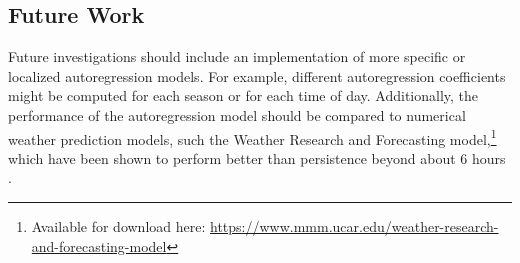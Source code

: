 \documentclass[11pt, oneside]{article}
\begin{document}
\subsection{Future Work} %
Future investigations should include an implementation of more specific or localized autoregression models.
For example, different autoregression coefficients might be computed for each season or for each time of day.
Additionally, the performance of the autoregression model should be compared to numerical weather prediction models, such the Weather Research and Forecasting model,\footnote{Available for download here: \url{https://www.mmm.ucar.edu/weather-research-and-forecasting-model}} which have been shown to perform better than persistence beyond about 6 hours \citep{Giebel2011,LandbergWatson1994}.



\end{document}
